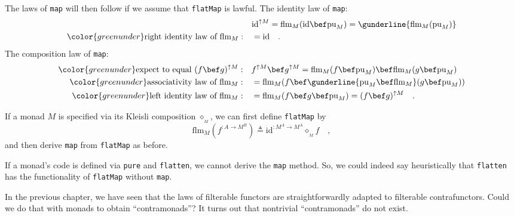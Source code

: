 The laws of \lstinline!map! will then follow if we assume that \lstinline!flatMap!
is lawful. The identity law of \lstinline!map!:
\begin{align*}
 & \text{id}^{\uparrow M}=\text{flm}_{M}(\text{id}\bef\text{pu}_{M})=\gunderline{\text{flm}_{M}(\text{pu}_{M})}\\
{\color{greenunder}\text{right identity law of }\text{flm}_{M}:}\quad & =\text{id}\quad.
\end{align*}
The composition law of \lstinline!map!:
\begin{align*}
{\color{greenunder}\text{expect to equal }(f\bef g)^{\uparrow M}:}\quad & f^{\uparrow M}\bef g^{\uparrow M}=\text{flm}_{M}(f\bef\text{pu}_{M})\bef\text{flm}_{M}(g\bef\text{pu}_{M})\\
{\color{greenunder}\text{associativity law of }\text{flm}_{M}:}\quad & =\text{flm}_{M}(f\bef\gunderline{\text{pu}_{M}\bef\text{flm}_{M}}(g\bef\text{pu}_{M}))\\
{\color{greenunder}\text{left identity law of }\text{flm}_{M}:}\quad & =\text{flm}_{M}(f\bef g\bef\text{pu}_{M})=(f\bef g)^{\uparrow M}\quad.
\end{align*}

If a monad $M$ is specified via its Kleisli composition $\diamond_{_{M}}$,
we can first define \lstinline!flatMap! by
\[
\text{flm}_{M}(f^{:A\rightarrow M^{B}})\triangleq\text{id}^{:M^{A}\rightarrow M^{A}}\diamond_{_{M}}f\quad,
\]
and then derive \lstinline!map! from \lstinline!flatMap! as before.

If a monad\textsf{'}s code is defined via \lstinline!pure! and \lstinline!flatten!,
we cannot derive the \lstinline!map! method. So, we could indeed
say heuristically that \lstinline!flatten! has the functionality
of \lstinline!flatMap! without \lstinline!map!.

In the previous chapter, we have seen that the laws of filterable
functors are straightforwardly adapted to filterable contrafunctors.
Could we do that with monads to obtain \textsf{``}contramonads\textsf{''}? It turns
out that nontrivial \textsf{``}contramonads\textsf{''} do not
exist. 


